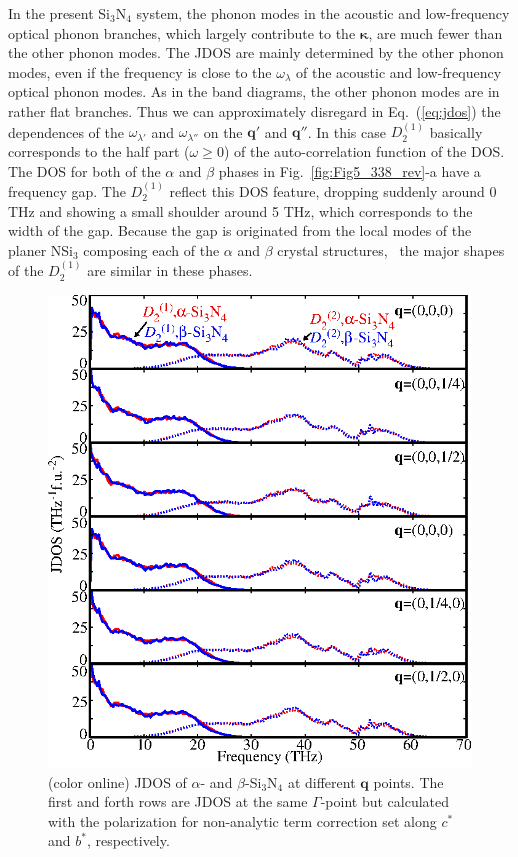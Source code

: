 \documentclass[twocolumn,amsmath,amssymb,a4paper,prb,superscriptaddress,floatfix]{revtex4-1}
\begin{document}
In the present Si$_3$N$_4$ system, the phonon modes in the acoustic and
low-frequency optical phonon branches, which largely contribute to the
$\boldsymbol{\kappa}$, are much fewer than the other phonon modes.  The JDOS are
mainly determined by the other phonon modes, even if the frequency is close to
the $\omega_\lambda$ of the acoustic and low-frequency optical phonon modes. As
in the band diagrams, the other phonon modes are in rather flat branches. Thus
we can approximately disregard in Eq.~(\ref{eq:jdos}) the dependences of the
$\omega_{\lambda'}$ and $\omega_{\lambda''}$ on the $\mathbf{q}'$ and
$\mathbf{q}''$.  In this case $D_2^{(1)}$ basically corresponds to the half part
($\omega \geq  0$) of the auto-correlation function of the DOS. The DOS for both
of the $\alpha$ and $\beta$ phases in Fig.~\ref{fig:Fig5_338_rev}-a have a
frequency gap. The $D_2^{(1)}$ reflect this DOS feature, dropping suddenly
around 0 THz and showing a small shoulder around 5 THz, which corresponds to the
width of the gap.  Because the gap is originated from the local modes of the
planer NSi$_3$ composing each of the $\alpha$ and $\beta$ crystal
structures,~\cite{kuwabara} the major shapes of the $D_2^{(1)}$ are similar in
these phases.  

\begin{figure}[ht]
 \centering
  \includegraphics[width=0.9\linewidth]{figure_jdoss.eps} \caption{(color
	  online) JDOS of $\alpha$- and $\beta$-Si$_3$N$_4$ at different $\mathbf q$ points.
  The first and forth rows are JDOS at the same $\Gamma$-point but calculated
  with the polarization for non-analytic term correction set along $c^*$ and
  $b^*$, respectively. \label{fig:Fig6_338} }
 \centering
\end{figure}
\end{document}
